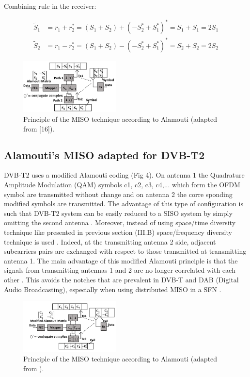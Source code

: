 \documentclass[10pt, conference]{IEEEtran}
\begin{document}
{    Combining rule in the receiver:
    
\begin{align}
    \tilde{S}_1 &= r_1 + r_2^* = (S_1 + S_2) + (-S_2^* + S_1^*)^* = S_1 + S_1 = 2 S_1 \\
    \tilde{S}_2 &= r_1 - r_2^* = (S_1 + S_2) - (-S_2^* + S_1^*)^* = S_2 + S_2 = 2 S_2 
\end{align}

 \begin{figure}[!htbp]
 \centering
    \includegraphics[width=0.45\textwidth]{images/3em_image.png}
    \caption{Principle of the MISO technique according to Alamouti (adapted from
 [16]).}
\end{figure}
}


\subsection{ Alamouti’s MISO adapted for DVB-T2}

\normalsize{
DVB-T2 uses a modified Alamouti coding (Fig 4). On
 antenna 1 the Quadrature Amplitude Modulation (QAM)
 symbols c1, c2, c3, c4,... which form the OFDM symbol
 are transmitted without change and on antenna 2 the corre
sponding modified symbols are transmitted. The advantage of
 this type of configuration is such that DVB-T2 system can
 be easily reduced to a SISO system by simply omitting the
 second antenna \cite{16}. Moreover, instead of using space/time
 diversity technique like presented in previous section (III.B)
 space/frequency diversity technique is used \cite{16}. Indeed, at
 the transmitting antenna 2 side, adjacent subcarriers pairs are
 exchanged with respect to those transmitted at transmitting
 antenna 1. The main advantage of this modified Alamouti
 principle is that the signals from transmitting antennas 1 and 2
 are no longer correlated with each other \cite{16}. This avoids the
 notches that are prevalent in DVB-T and DAB (Digital Audio
 Broadcasting), especially when using distributed MISO in a
 SFN \cite{16}.

}

 \begin{figure}[!htbp]
\centering
    \includegraphics[width=0.45\textwidth]{images/4em_image.png}
    \caption{Principle of the MISO technique according to Alamouti (adapted from
 \cite{16}).}
\end{figure}
\end{document}
